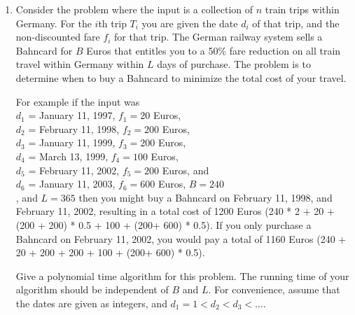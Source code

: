 \documentclass[letterpaper,12pt]{article}
\begin{document}
\begin{enumerate}
\begin{enumerate}


\end{enumerate}


    







\item 
Consider the problem where the input is a collection of $n$ train
trips within Germany. For the $i$th trip $T_i$ you are given the date $d_i$ of
that trip, and the non-discounted fare $f_i$ for that trip.
The German railway system sells a Bahncard for $B$ Euros that
entitles you to a 50\% fare reduction on all train travel
within Germany within $L$ days of purchase.
The problem is to determine when to buy a Bahncard to minimize the
total cost of your travel.
 
For example if the input was \\
$d_1$ = January 11, 1997, $f_1=20$ Euros, \\
$d_2$ = February 11, 1998, $f_2=200$ Euros, \\
$d_3$ = January 11, 1999, $f_3=200$ Euros, \\
$d_4$ = March 13, 1999, $f_4=100$ Euros, \\
$d_5$ = February 11, 2002, $f_5=200$ Euros, and \\
$d_6$ = January 11, 2003, $f_6=600$ Euros, $B=240$\\
, and $L=365$ then
you might buy a Bahncard on February 11, 1998, and
February 11, 2002, resulting in a total cost of
1200 Euros (240 * 2 + 20 + (200 + 200) * 0.5 + 100 + (200+ 600) * 0.5). If you only purchase a Bahncard on 
February 11, 2002, you would pay a total of 1160 Euros (240 + 20 + 200 + 200 + 100 + (200+ 600) * 0.5).
 
Give a polynomial time algorithm for this problem.
The running time of your algorithm should be independent of
$B$ and $L$. For convenience, assume that the dates are given as integers, and 
$d_1 = 1 < d_2 < d_3 < \ldots$. 

\end{enumerate}
\end{document}
